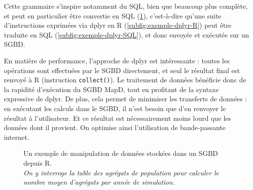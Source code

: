 Cette \og grammaire\fg{} s'inspire notamment du SQL, bien que beaucoup plus complète, et peut en particulier être \og convertie\fg{} en SQL (\cref{fig:dml-simedb}), c'est-à-dire qu'une suite d'instructions exprimées via \textsf{dplyr} en \textsf{R} (\cref{subfig:exemple-dplyr-R}) peut être traduite en SQL (\cref{subfig:exemple-dplyr-SQL}), et donc envoyée et exécutée sur un SGBD.

En matière de performance, l'approche de \textsf{dplyr} est intéressante : toutes les opérations sont effectuées par le SGBD directement, et seul le résultat final est renvoyé à \textsf{R} (instruction \texttt{collect()}).
Le traitement de données bénéficie donc de la rapidité d'exécution du SGBD MapD, tout en profitant de la syntaxe expressive de \textsf{dplyr}.
De plus, cela permet de minimiser les transferts de données : en exécutant les calculs dans le SGBD, il n'est besoin que d'en renvoyer le résultat à l'utilisateur.
Et ce résultat est nécessairement moins lourd que les données dont il provient.
On optimise ainsi l'utilisation de bande-passante internet.

\begin{figure}[H]
	\centering
	\hspace{5pt}
	\vspace{-0.3cm}
	\vspace{-0.3cm}
	\caption[Un exemple de manipulation de données stockées dans un SGBD depuis \textsf{R}.]{Un exemple de manipulation de données stockées dans un SGBD depuis \textsf{R}.\\
	\textit{On y interroge la table des agrégats de population pour calculer le nombre moyen d'agrégats par année de simulation.}}
	\label{fig:dml-simedb}
\end{figure}

